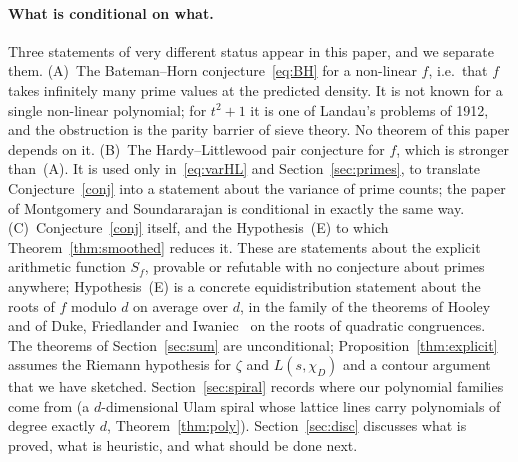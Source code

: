 \documentclass[11pt,a4paper]{article}
\theoremstyle{remark}\newtheorem{remark}[theorem]{Remark}
\begin{document}
\paragraph{What is conditional on what.} Three statements of very different status appear in this
paper, and we separate them. (A)~The Bateman--Horn conjecture~\eqref{eq:BH} for a non-linear $f$, i.e.\
that $f$ takes infinitely many prime values at the predicted density. It is not known for a single
non-linear polynomial; for $t^2+1$ it is one of Landau's problems of 1912, and the obstruction is the
parity barrier of sieve theory. No theorem of this paper depends on it. (B)~The Hardy--Littlewood pair
conjecture for $f$, which is stronger than~(A). It is used only in~\eqref{eq:varHL} and
Section~\ref{sec:primes}, to translate Conjecture~\ref{conj} into a statement about the variance of prime
counts; the paper of Montgomery and Soundararajan is conditional in exactly the same way. (C)~Conjecture~\ref{conj}
itself, and the Hypothesis~(E) to which Theorem~\ref{thm:smoothed} reduces it. These are statements about
the explicit arithmetic function $S_f$, provable or refutable with no conjecture about primes anywhere;
Hypothesis~(E) is a concrete equidistribution statement about the roots of $f$ modulo $d$ on average
over $d$, in the family of the theorems of Hooley~\cite{Hooley1963} and of Duke, Friedlander and
Iwaniec~\cite{DFI1995} on the roots of quadratic congruences. The theorems of Section~\ref{sec:sum} are
unconditional; Proposition~\ref{thm:explicit} assumes the Riemann hypothesis for $\zeta$ and
$L(s,\chi_D)$ and a contour argument that we have sketched. Section~\ref{sec:spiral} records where our polynomial families come from (a
$d$-dimensional Ulam spiral whose lattice lines carry polynomials of degree exactly $d$,
Theorem~\ref{thm:poly}). Section~\ref{sec:disc} discusses what is proved, what is heuristic, and what
should be done next.
\end{document}
